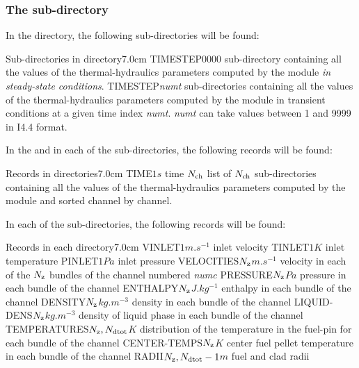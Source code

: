\subsubsection{The  sub-directory}\label{sect:thmdirhistorydata}

In the  directory, the following sub-directories will be found:
\begin{DescriptionEnregistrement}{Sub-directories in  directory}{7.0cm} \label{tabl:tabhistorydatadir}
 \DirEnr
 {TIMESTEP0000}
 {sub-directory containing all the values of the thermal-hydraulics parameters computed by the  module {\sl in steady-state conditions}.}
 \DirEnr
 {TIMESTEP{\sl numt}}
 {sub-directories containing all the values of the thermal-hydraulics parameters computed by the  module in transient conditions at a given time index {\sl numt}. {\sl numt} can take values between 1 and 9999 in I4.4 format.}
\end{DescriptionEnregistrement}

\noindent In the  and in each of the  sub-directories, the following records will be found:
\begin{DescriptionEnregistrement}{Records in  directories}{7.0cm} \label{tabl:tabtimestepdir}
 \RealEnr
 {TIME}{$1$}{$s$}
 {time}
 \DirlEnr
 {}{$N_{\rm ch}$}
 {list of $N_{\rm ch}$ sub-directories containing all the values of the thermal-hydraulics parameters computed by the  module and sorted channel by channel.}
\end{DescriptionEnregistrement}

\noindent In each of the  sub-directories, the following records will be found:
\begin{DescriptionEnregistrement}{Records in each  directory}{7.0cm} \label{tabl:tabchanneldir}
 \RealEnr
 {VINLET}{$1$}{$m.s^{-1}$}
 {inlet velocity}
 \RealEnr
 {TINLET}{$1$}{$K$}
 {inlet temperature}
 \RealEnr
 {PINLET}{$1$}{$Pa$}
 {inlet pressure}
 \RealEnr
 {VELOCITIES}{$N_{\rm z}$}{$m.s^{-1}$}
 {velocity in each of the $N_{\rm z}$ bundles of the channel numbered {\sl numc}}
 \RealEnr
 {PRESSURE}{$N_{\rm z}$}{$Pa$}
 {pressure in each bundle of the channel}
 \RealEnr
 {ENTHALPY}{$N_{\rm z}$}{$J.kg^{-1}$}
 {enthalpy in each bundle of the channel}
 \RealEnr
 {DENSITY}{$N_{\rm z}$}{$kg.m^{-3}$}
 {density in each bundle of the channel}
 \RealEnr
 {LIQUID-DENS}{$N_{\rm z}$}{$kg.m^{-3}$}
 {density of liquid phase in each bundle of the channel}
 \RealEnr
 {TEMPERATURES}{$N_{\rm z}, N_{\rm dtot}$}{$K$}
 {distribution of the temperature in the fuel-pin for each bundle of the channel}
 \RealEnr
 {CENTER-TEMPS}{$N_{\rm z}$}{$K$}
 {center fuel pellet temperature in each bundle of the channel}
 \RealEnr
 {RADII}{$N_{\rm z}, N_{\rm dtot}-1$}{$m$}
 {fuel and clad radii}
\end{DescriptionEnregistrement}

\clearpage
